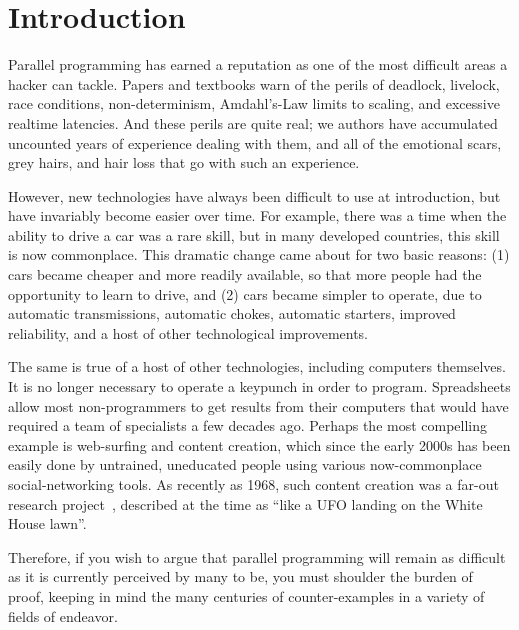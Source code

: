 
\chapter{Introduction}
\label{chp:Introduction}


Parallel programming has earned a reputation as one of the most
difficult areas a hacker can tackle.
Papers and textbooks warn of the perils of deadlock, livelock,
race conditions, non-determinism, Amdahl's-Law limits to scaling,
and excessive realtime latencies.
And these perils are quite real; we authors have accumulated uncounted
years of experience dealing with them, and all of the emotional scars,
grey hairs, and hair loss that go with such an experience.

However, new technologies have always been difficult to use at introduction,
but have invariably become easier over time.
For example, there was a time when the ability to drive a car was a rare
skill, but in many developed countries, this skill is now commonplace.
This dramatic change came about for two basic reasons: (1) cars became
cheaper and more readily available, so that more people had the
opportunity to learn to drive, and (2) cars became simpler to operate,
due to automatic transmissions, automatic chokes, automatic starters,
improved reliability,
and a host of other technological improvements.

The same is true of a host of other technologies, including computers
themselves.
It is no longer necessary to operate a keypunch in order to program.
Spreadsheets allow most non-programmers to get results from their computers
that would have required a team of specialists a few decades ago.
Perhaps the most compelling example is web-surfing and content creation,
which since the early 2000s has been easily done by
untrained, uneducated people using various now-commonplace
social-networking tools.
As recently as 1968, such content creation was a far-out research
project~\cite{DouglasEngelbart1968}, described at
the time as
``like a UFO landing on the White House lawn''\cite{ScottGriffen2000}.

Therefore, if you wish to argue that parallel programming will remain
as difficult as it is currently perceived by many to be, you must shoulder
the burden of proof, keeping in mind the many centuries of counter-examples
in a variety of fields of endeavor.

